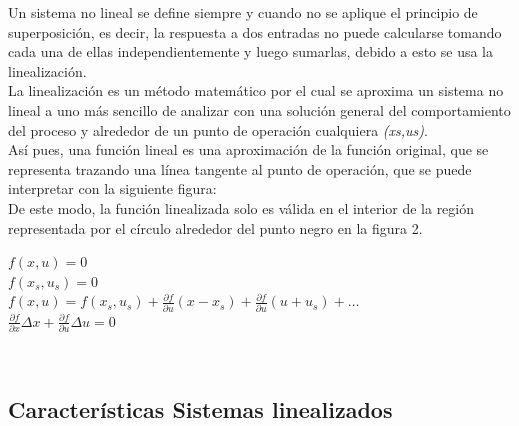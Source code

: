 \documentclass[a4paper,12pt,twoside]{proyectotanquesecci}
\begin{document}
Un sistema no lineal se define siempre y cuando no se aplique el principio de superposición, es decir, la respuesta a dos entradas no puede calcularse tomando cada una de ellas independientemente y luego sumarlas, debido a esto se usa la linealización.\\


La linealización es un método matemático por el cual se aproxima un sistema no lineal a uno más sencillo de analizar con una solución general del comportamiento del proceso y alrededor de un punto de operación cualquiera \textit{(xs,us)}.\\

Así pues, una función lineal es una aproximación de la función original, que se representa trazando una línea tangente al punto de operación, que se puede interpretar con la siguiente figura:\\


De este modo, la función linealizada solo es válida en el interior de la región representada por el círculo alrededor del punto negro en la figura 2.

\begin{center}
	$f\left( x,u\right)=0$ \\
	$f\left( x_{s},u_{s}\right) =0$ \\
	$f\left( x,u\right) = f\left( x_{s},u_{s}\right) +\frac {\partial f}{\partial u}\left( x-x_{s}\right) +\frac {\partial f}{\partial u}\left( u+u_{s}\right) +\ldots$ \\
	$\frac {\partial f}{\partial x}\Delta x+\frac {\partial f}{\partial u}\Delta u=0$
\end{center}

\subsection{Características Sistemas linealizados}
\end{document}

